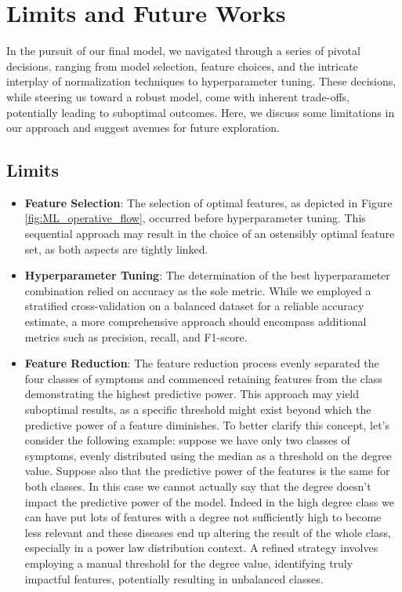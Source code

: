 \section{Limits and Future Works}
\label{sec:future_works}

In the pursuit of our final model, we navigated through a series of pivotal decisions, ranging from model selection, feature choices, 
and the intricate interplay of normalization techniques to hyperparameter tuning. These decisions, while steering us toward a robust model, 
come with inherent trade-offs, potentially leading to suboptimal outcomes. Here, we discuss some limitations in our approach and suggest 
avenues for future exploration.

\subsection{Limits}
\label{subsec:limits}

\begin{itemize}
\item \textbf{Feature Selection}: The selection of optimal features, as depicted in Figure \ref{fig:ML_operative_flow}, occurred 
before hyperparameter tuning. This sequential approach may result in the choice of an ostensibly optimal feature set, 
as both aspects are tightly linked.

\item \textbf{Hyperparameter Tuning}: The determination of the best hyperparameter combination relied on accuracy as 
the sole metric. While we employed a stratified cross-validation on a balanced dataset for a reliable accuracy estimate, 
a more comprehensive approach should encompass additional metrics such as precision, recall, and F1-score.

\item \textbf{Feature Reduction}: The feature reduction process evenly separated the four classes of symptoms and commenced 
retaining features from the class demonstrating the highest predictive power. This approach may yield suboptimal results, as a 
specific threshold might exist beyond which the predictive power of a feature diminishes. 
To better clarify this concept, let's consider the following example: suppose we have only two classes of symptoms, evenly distributed 
using the median as a threshold on the degree value. Suppose also that the predictive power of the features is the same for both classes.
In this case we cannot actually say that the degree doesn't impact the predictive power of the model. Indeed in the high degree class
we can have put lots of features with a degree not sufficiently high to become less relevant and these diseases end up
altering the result of the whole class, especially in a power law distribution context. 
A refined strategy involves employing a manual threshold for the degree value, identifying truly impactful features, 
potentially resulting in unbalanced classes.

\end{itemize}

